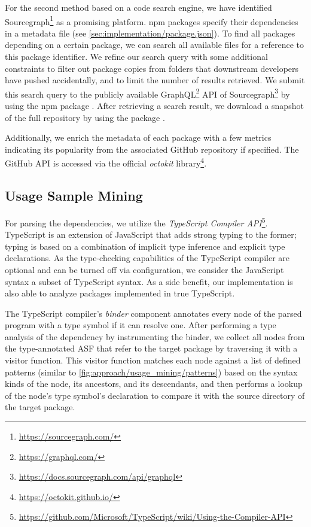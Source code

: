 For the second method based on a code search engine, we have identified Sourcegraph\footnote{\url{https://sourcegraph.com/}} as a promising platform.
npm packages specify their dependencies in a  metadata file (see \cref{sec:implementation/package.json}).
To find all packages depending on a certain package, we can search all available  files for a reference to this package identifier.
We refine our search query with some additional constraints to filter out package copies from  folders that downstream developers have pushed accidentally, and to limit the number of results retrieved.
We submit this search query to the publicly available GraphQL\footnote{\url{https://graphql.com/}} API of Sourcegraph\footnote{\url{https://docs.sourcegraph.com/api/graphql}} by using the npm package .
After retrieving a search result, we download a snapshot of the full repository by using the package .

Additionally, we enrich the metadata of each package with a few metrics indicating its popularity from the associated GitHub repository if specified.
The GitHub API is accessed via the official \emph{octokit} library\footnote{\url{https://octokit.github.io/}}.

\subsection{Usage Sample Mining}
\label{sec:implementation/usage_mining}

For parsing the dependencies, we utilize the \emph{TypeScript Compiler API}\footnote{\url{https://github.com/Microsoft/TypeScript/wiki/Using-the-Compiler-API}}.
TypeScript is an extension of JavaScript that adds strong typing to the former; typing is based on a combination of implicit type inference and explicit type declarations.
As the type-checking capabilities of the TypeScript compiler are optional and can be turned off via configuration, we consider the JavaScript syntax a subset of TypeScript syntax.
As a side benefit, our implementation is also able to analyze packages implemented in true TypeScript.

The TypeScript compiler's \emph{binder} component annotates every node of the parsed program with a type symbol if it can resolve one.
After performing a type analysis of the dependency by instrumenting the binder, we collect all nodes from the type-annotated ASF that refer to the target package by traversing it with a visitor function.
This visitor function matches each node against a list of defined patterns (similar to \cref{fig:approach/usage_mining/patterns}) based on the syntax kinds of the node, its ancestors, and its descendants, and then performs a lookup of the node's type symbol's declaration to compare it with the source directory of the target package.

